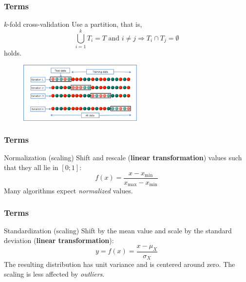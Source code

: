 \documentclass[aspectratio=169]{beamer}
\begin{document}
	\begin{frame}
		\frametitle{Terms}
		\begin{block}{$k$-fold cross-validation}
			Use a partition, that is,
			\begin{equation*}
				\bigcup\limits_{i = 1}^k T_i = T \text{ and } 	i \neq j \Rightarrow T_i \cap T_j = \emptyset 
			\end{equation*}
			holds.
			\begin{figure}
				\includegraphics[width=0.55\textwidth]{./../figs/cross-validation.png}
			\end{figure}
		\end{block}
	\end{frame}

		\begin{frame}
		\frametitle{Terms}
		\begin{block}{Normalization (scaling)}
			Shift and rescale (\textbf{linear transformation}) values such that they all lie in $[0;1]$:
			\begin{equation}
				f(x) = \frac{x - x_\text{min}}{x_\text{max} - x_\text{min}} 
			\end{equation}
			Many algorithms expect \textit{normalized} values.
		\end{block}
	\end{frame}

		\begin{frame}
		\frametitle{Terms}
		\begin{block}{Standardization (scaling)}
			Shift by the mean value and scale by the standard deviation (\textbf{linear transformation}):
			\begin{equation}
				y = f(x) = \frac{x - \mu_X}{\sigma_X} 
			\end{equation}
			The resulting distribution has unit variance and is centered around zero.
			The scaling is less affected by \textit{outliers}.
		\end{block}
	\end{frame}
\end{document}
